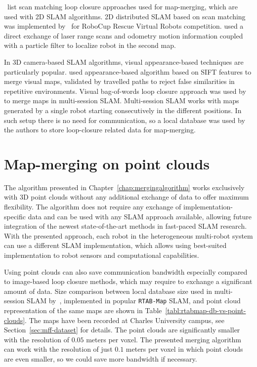 \citet{lee2012survey}~list scan matching loop closure approaches used for map-merging, which are used with \gls{2D} \gls{SLAM} algorithms. \gls{2D} distributed \gls{SLAM} based on scan matching was implemented by~\citet{pfingsthorn2007scalable} for RoboCup Rescue Virtual Robots competition. \citet{fox2006distributed} used a direct exchange of laser range scans and odometry motion information coupled with a particle filter to localize robot in the second map.

In \gls{3D} camera-based \gls{SLAM} algorithms, visual appearance-based techniques are particularly popular. \citet{tomono2013merging} used appearance-based algorithm based on \gls{SIFT} features to merge visual maps, validated by travelled paths to reject false similarities in repetitive environments. Visual bag-of-words loop closure approach was used by~\citet{labbe2014online} to merge maps in multi-session \gls{SLAM}. Multi-session \gls{SLAM} works with maps generated by a single robot starting consecutively in the different positions. In such setup there is no need for communication, so a local database was used by the authors to store loop-closure related data for map-merging.

\section{Map-merging on point clouds}
\label{sec:map-merging-on-point-clouds}

The algorithm presented in Chapter~\ref{chap:mergingalgorithm} works exclusively with \gls{3D} point clouds without any additional exchange of data to offer maximum flexibility. The algorithm does not require any exchange of implementation-specific data and can be used with any \gls{SLAM} approach available, allowing future integration of the newest state-of-the-art methods in fast-paced \gls{SLAM} research. With the presented approach, each robot in the heterogeneous multi-robot system can use a different \gls{SLAM} implementation, which allows using best-suited implementation to robot sensors and computational capabilities.

Using point clouds can also save communication bandwidth especially compared to image-based loop closure methods, which may require to exchange a significant amount of data. Size comparison between local database size used in multi-session \gls{SLAM} by~\citet{labbe2014online}, implemented in popular \texttt{RTAB-Map} \gls{SLAM}, and point cloud representation of the same maps are shown in Table~\ref{tabl:rtabmap-db-vs-point-clouds}. The maps have been recorded at Charles University campus, see Section~\ref{sec:mff-dataset} for details. The point clouds are significantly smaller with the resolution of $0.05$ meters per voxel. The presented merging algorithm can work with the resolution of just $0.1$ meters per voxel in which point clouds are even smaller, so we could save more bandwidth if necessary.

